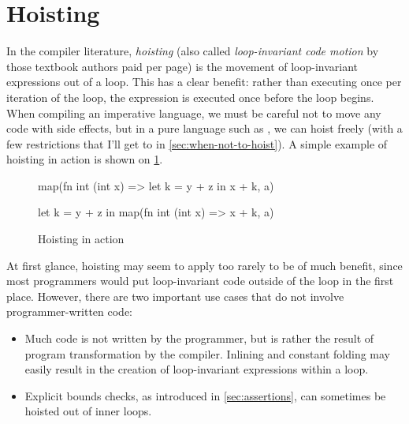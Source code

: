 \section{Hoisting}
\label{sec:hoisting}

In the compiler literature, \textit{hoisting} (also called
\textit{loop-invariant code motion} by those textbook authors paid per
page) is the movement of loop-invariant expressions out of a loop.
This has a clear benefit: rather than executing once per iteration of
the loop, the expression is executed once before the loop begins.
When compiling an imperative language, we must be careful not to move
any code with side effects, but in a pure language such as \LO{}, we
can hoist freely (with a few restrictions that I'll get to in
\cref{sec:when-not-to-hoist}).  A simple example of hoisting in action
is shown on \cref{fig:simple-hoisting}.

\begin{figure}
\begin{center}
\begin{bcolorcode}
map(fn int (int x) =>
      let k = y + z in
      x + k,
    a)
\end{bcolorcode}
\hspace{1cm}
%
\hspace{1cm}
\begin{bcolorcode}
let k = y + z in
map(fn int (int x) =>
      x + k,
    a)
\end{bcolorcode}
\end{center}

\caption{Hoisting in action}
\label{fig:simple-hoisting}
\end{figure}

At first glance, hoisting may seem to apply too rarely to be of much
benefit, since most programmers would put loop-invariant code outside
of the loop in the first place.  However, there are two important use
cases that do not involve programmer-written code:

\begin{itemize}
\item Much \LO{} code is not written by the programmer, but is rather
  the result of program transformation by the compiler.  Inlining and
  constant folding may easily result in the creation of loop-invariant
  expressions within a loop.

\item Explicit bounds checks, as introduced in \cref{sec:assertions},
  can sometimes be hoisted out of inner loops.
\end{itemize}

